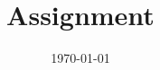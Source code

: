 \documentclass{SelimArticle} %
\title{Assignment}   %
\date{\today}
\begin{document}
\mytitlepage

\end{document}
